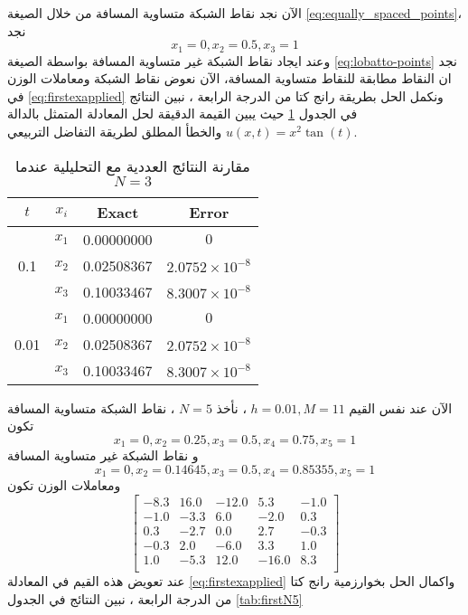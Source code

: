 \begin{example}
\[ 	\]
 	الآن نجد نقاط الشبكة متساوية المسافة من خلال الصيغة \eqref{eq:equally_spaced_points}، نجد
 	\[
 	x_1 = 0, x_2 = 0.5, x_3 = 1
 	\]
 	وعند ايجاد نقاط الشبكة غير متساوية المسافة بواسطة الصيغة \eqref{eq:lobatto-points} نجد ان النقاط مطابقة للنقاط متساوية المسافة، الآن نعوض نقاط الشبكة ومعاملات الوزن في \eqref{eq:firstexapplied} ونكمل الحل بطريقة رانج كتا من الدرجة الرابعة ، نبين النتائج في الجدول \ref{tab:firstN3} حيث يبين القيمة الدقيقة لحل المعادلة المتمثل بالدالة
 	 $u(x, t) = x^2 \tan(t)$ والخطأ المطلق لطريقة التفاضل التربيعي.
\begin{table}[H]
	\centering
	\renewcommand{\arraystretch}{1.5}
	\begin{english}
		\begin{tabular}{|c|c|c|c|}
			\hline
			$t$ & $x_i$ & Exact & Error\\
			\hline
			\multirow{3}{*}{0.1}  & $x_1$ & 0.00000000  & $0$ \\
			& $x_2$ & 0.02508367  & $2.0752\times10^{-8}$ \\
			& $x_3$ & 0.10033467  & $8.3007\times10^{-8}$ \\
			\hline
			\multirow{3}{*}{0.01} & $x_1$ & 0.00000000  & $0$ \\
			& $x_2$ & 0.02508367  & $2.0752\times10^{-8}$ \\
			& $x_3$ & 0.10033467  & $8.3007\times10^{-8}$ \\
			\hline
		\end{tabular}
	\end{english}
	\caption{مقارنة النتائج العددية مع التحليلية عندما $N=3$}
		\label{tab:firstN3}
\end{table}
الآن عند نفس القيم $h=0.01, M=11 $ ، نأخذ $N=5$ ، نقاط الشبكة متساوية المسافة تكون
\[
x_1 = 0, x_2 =0.25, x_3 = 0.5 , x_4=0.75, x_5 =1
\]
و نقاط الشبكة غير متساوية المسافة
\[
           x_1= 0,x_2=      0.14645   ,  x_3=     0.5, x_4=      0.85355   , x_5=   1
\]
ومعاملات الوزن تكون
\[
\begin{bmatrix}
	-8.3 & 16.0 & -12.0 & 5.3 & -1.0 \\
	-1.0 & -3.3 & 6.0 & -2.0 & 0.3 \\
	0.3 & -2.7 & 0.0 & 2.7 & -0.3 \\
	-0.3 & 2.0 & -6.0 & 3.3 & 1.0 \\
	1.0 & -5.3 & 12.0 & -16.0 & 8.3 \\
\end{bmatrix}
\]
عند تعويض هذه القيم في المعادلة \eqref{eq:firstexapplied} واكمال الحل بخوارزمية رانج كتا من الدرجة الرابعة ، نبين النتائج في الجدول \ref{tab:firstN5} 
	

\end{example}
